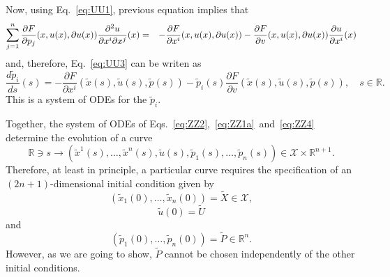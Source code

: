\documentclass[11pt,spanish]{article}
\newcommand{\RR}{\mathbb{R}}
\begin{document}
Now, using Eq.~\ref{eq:UU1}, previous equation implies that
\begin{eqnarray}
\sum_{j=1}^n
\frac{\partial F}{\partial p_j}(x,u(x),\partial u(x))
\frac{\partial^2 u}{\partial x^i\partial x^j}(x)
&=&
-
\frac{\partial F}{\partial x^i}(x,u(x),\partial u(x))
-
\frac{\partial F}{\partial v}(x,u(x),\partial u(x))
\frac{\partial u}{\partial x^i}(x)
\notag
\end{eqnarray}
and, therefore, Eq.~\ref{eq:UU3} can be writen as
\begin{equation}
\label{eq:ZZ4}
\frac{d\tilde p_i}{ds}(s)
=
-
\frac{\partial F}{\partial x^i}
(\tilde x(s),\tilde u(s),\tilde p(s))
-
\tilde p_i(s)
\frac{\partial F}{\partial v}
(\tilde x(s),\tilde u(s),\tilde p(s)),
\quad 
s\in \RR.
\end{equation}
This is a system of ODEs for the $\tilde{p}_i$.

Together, the system of ODEs of Eqs.~\ref{eq:ZZ2},~\ref{eq:ZZ1a}~and~\ref{eq:ZZ4} determine the evolution of a curve
$$
\RR\ni s
\to
(\tilde x^1(s),\dots,\tilde x^n(s),\tilde u(s),\tilde p_1(s),\dots,\tilde p_n(s))\in
\mathcal X\times \RR^{n+1}.
$$
Therefore, at least in principle, a particular curve requires the specification of an $(2n+1)$-dimensional initial condition given by
$$
(\tilde x_1(0),\dots,\tilde x_n(0))
=
\tilde X
\in \mathcal X,
$$
$$
\tilde u(0) = \tilde U
$$
and
$$
(\tilde p_1(0),\dots,\tilde p_n(0))
=
\tilde P
\in \RR^n.
$$
However, as we are going to show, $\tilde P$ cannot be chosen independently of the other initial conditions.
\end{document}
